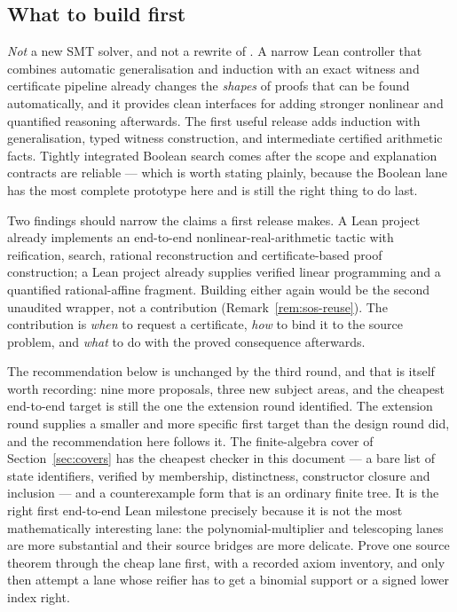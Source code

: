 \subsection{What to build first}

\emph{Not} a new SMT solver, and not a rewrite of \grind{}. A narrow Lean
controller that combines automatic generalisation and induction with an exact
witness and certificate pipeline already changes the \emph{shapes} of proofs
that can be found automatically, and it provides clean interfaces for adding
stronger nonlinear and quantified reasoning afterwards. The first useful release
adds induction with generalisation, typed witness construction, and intermediate
certified arithmetic facts. Tightly integrated Boolean search comes after the
scope and explanation contracts are reliable --- which is worth stating plainly,
because the Boolean lane has the most complete prototype here and is still the
right thing to do last.

Two findings should narrow the claims a first release makes. A Lean 
project already implements an end-to-end nonlinear-real-arithmetic tactic with
reification, search, rational reconstruction and certificate-based proof
construction; a Lean  project already supplies verified linear
programming and a quantified rational-affine fragment. Building either again
would be the second unaudited wrapper, not a contribution
(Remark~\ref{rem:sos-reuse}). The contribution is \emph{when} to request a
certificate, \emph{how} to bind it to the source problem, and \emph{what} to do
with the proved consequence afterwards.

The recommendation below is unchanged by the third round, and that is itself
worth recording: nine more proposals, three new subject areas, and the cheapest
end-to-end target is still the one the extension round identified. The
extension round supplies a smaller and more specific first target than the
design round did, and the recommendation here follows it. The finite-algebra
cover of Section~\ref{sec:covers} has the cheapest checker in this document ---
a bare list of state identifiers, verified by membership, distinctness,
constructor closure and inclusion --- and a counterexample form that is an
ordinary finite tree. It is the right first end-to-end Lean milestone precisely
because it is not the most mathematically interesting lane: the
polynomial-multiplier and telescoping lanes are more substantial and their
source bridges are more delicate. Prove one source theorem through the cheap
lane first, with a recorded axiom inventory, and only then attempt a lane whose
reifier has to get a binomial support or a signed lower index right.


